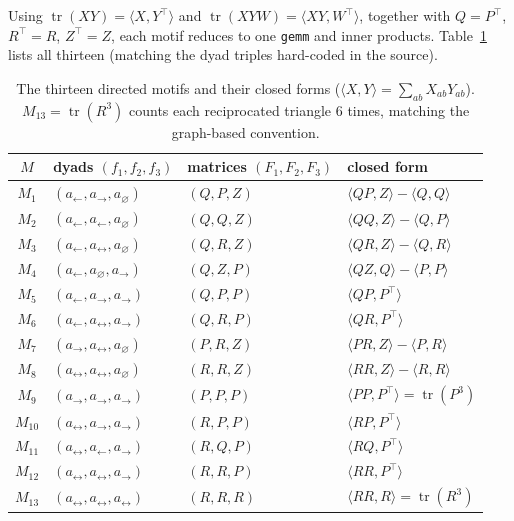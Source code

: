\documentclass[11pt]{article}
\theoremstyle{plain}
\theoremstyle{definition}
\newcommand{\tr}{\operatorname{tr}}
\begin{document}
Using $\tr(XY)=\langle X,Y^\top\rangle$ and $\tr(XYW)=\langle XY,W^\top\rangle$, together with
$Q=P^\top$, $R^\top=R$, $Z^\top=Z$, each motif reduces to one \texttt{gemm} and inner products.
Table~\ref{tab:motifs} lists all thirteen (matching the dyad triples hard-coded in the source).

\begin{table}[t]
\centering
\small
\begin{tabular}{clll}
\toprule
$M$ & dyads $(f_1,f_2,f_3)$ & matrices $(F_1,F_2,F_3)$ & closed form \\
\midrule
$M_{1}$  & $(a_\leftarrow,a_\to,a_\varnothing)$        & $(Q,P,Z)$ & $\langle QP,Z\rangle-\langle Q,Q\rangle$ \\
$M_{2}$  & $(a_\leftarrow,a_\leftarrow,a_\varnothing)$ & $(Q,Q,Z)$ & $\langle QQ,Z\rangle-\langle Q,P\rangle$ \\
$M_{3}$  & $(a_\leftarrow,a_\leftrightarrow,a_\varnothing)$ & $(Q,R,Z)$ & $\langle QR,Z\rangle-\langle Q,R\rangle$ \\
$M_{4}$  & $(a_\leftarrow,a_\varnothing,a_\to)$        & $(Q,Z,P)$ & $\langle QZ,Q\rangle-\langle P,P\rangle$ \\
$M_{5}$  & $(a_\leftarrow,a_\to,a_\to)$                & $(Q,P,P)$ & $\langle QP,P^\top\rangle$ \\
$M_{6}$  & $(a_\leftarrow,a_\leftrightarrow,a_\to)$    & $(Q,R,P)$ & $\langle QR,P^\top\rangle$ \\
$M_{7}$  & $(a_\to,a_\leftrightarrow,a_\varnothing)$   & $(P,R,Z)$ & $\langle PR,Z\rangle-\langle P,R\rangle$ \\
$M_{8}$  & $(a_\leftrightarrow,a_\leftrightarrow,a_\varnothing)$ & $(R,R,Z)$ & $\langle RR,Z\rangle-\langle R,R\rangle$ \\
$M_{9}$  & $(a_\to,a_\to,a_\to)$                       & $(P,P,P)$ & $\langle PP,P^\top\rangle=\tr(P^3)$ \\
$M_{10}$ & $(a_\leftrightarrow,a_\to,a_\to)$           & $(R,P,P)$ & $\langle RP,P^\top\rangle$ \\
$M_{11}$ & $(a_\leftrightarrow,a_\leftarrow,a_\to)$    & $(R,Q,P)$ & $\langle RQ,P^\top\rangle$ \\
$M_{12}$ & $(a_\leftrightarrow,a_\leftrightarrow,a_\to)$ & $(R,R,P)$ & $\langle RR,P^\top\rangle$ \\
$M_{13}$ & $(a_\leftrightarrow,a_\leftrightarrow,a_\leftrightarrow)$ & $(R,R,R)$ & $\langle RR,R\rangle=\tr(R^3)$ \\
\bottomrule
\end{tabular}
\caption{The thirteen directed motifs and their closed forms
($\langle X,Y\rangle=\sum_{ab}X_{ab}Y_{ab}$).
$M_{13}=\tr(R^3)$ counts each reciprocated triangle $6$ times, matching the graph-based convention.}
\label{tab:motifs}
\end{table}
\end{document}
